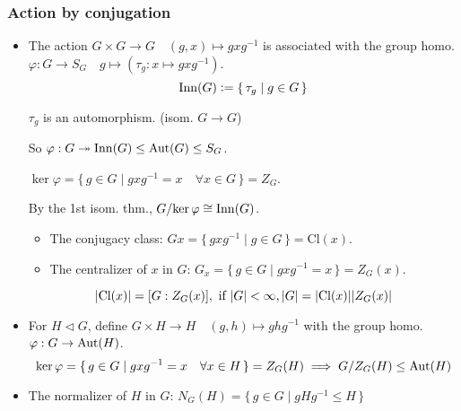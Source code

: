 \subsubsection{Action by conjugation}
\begin{itemize}
  \item The action $G \times G \to G \quad (g,x) \mapsto gxg^{-1}$ is
    associated with the group homo. $\varphi: G \to S_G \quad g \mapsto
    (\tau_g: x \mapsto gxg^{-1})$.
    \[
      \operatorname{Inn}(G) \vcentcolon= \{\, \tau_g \mid g \in G \,\}
    \]

    \begin{fact} 
      $\tau_g$ is an automorphism. (isom. $G \to G$)
    \end{fact}

    So $\varphi: G \twoheadrightarrow \operatorname{Inn}(G) \le \operatorname{Aut}(G) \le S_G$.

    $\ker\varphi = \{\, g\in G \mid gxg^{-1} = x \quad \forall x \in G \,\}
    = Z_G$.

    By the 1st isom. thm., ${G}/{\ker\varphi} \cong \operatorname{Inn}(G)$.
    \begin{itemize}
      \item The conjugacy class:
        $Gx = \{\, gxg^{-1} \mid g \in G \,\} = \text{Cl}(x)$.
      \item The centralizer of $x$ in $G$:
        $G_x = \{\, g \in G \mid gxg^{-1} = x \,\} = Z_G(x)$.
    \end{itemize}
    \[
      \lvert\text{Cl}(x)\rvert = [G:Z_G(x)], \text{~if~} \lvert G\rvert < \infty, 
      \lvert G\rvert = \lvert\text{Cl}(x)\rvert\lvert Z_G(x)\rvert
    \]
  \item For $H \lhd G$, define $G \times H \to H \quad (g, h) \mapsto ghg^{-1}$
    with the group homo. $\varphi: G \to \operatorname{Aut}(H)$.
    \[
      \ker\varphi = \{\, g\in G \mid gxg^{-1} = x \quad \forall x \in H \,\}
      = Z_G(H)
      \implies {G}/{Z_G(H)} \le \operatorname{Aut}(H)
    \]
  \item The normalizer of $H$ in $G$:
    $N_G(H) = \{\, g\in G \mid gHg^{-1} \le H \,\}$
\end{itemize}
